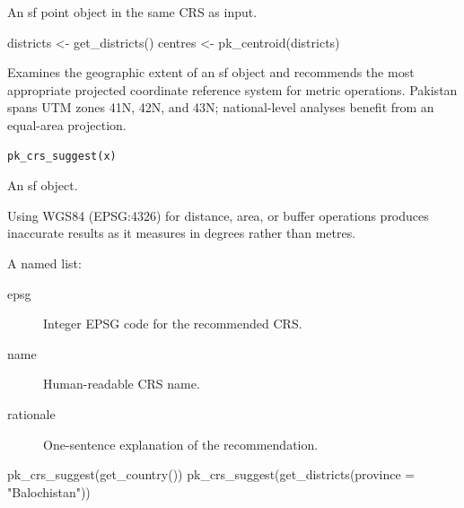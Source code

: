 \documentclass[a4paper]{book}
\begin{document}
%
\begin{Value}
An sf point object in the same CRS as input.
\end{Value}
%
\begin{Examples}
\begin{ExampleCode}

  districts <- get_districts()
  centres   <- pk_centroid(districts)

\end{ExampleCode}
\end{Examples}
%
\begin{Description}
Examines the geographic extent of an sf object and recommends the most
appropriate projected coordinate reference system for metric operations.
Pakistan spans UTM zones 41N, 42N, and 43N; national-level analyses
benefit from an equal-area projection.
\end{Description}
%
\begin{Usage}
\begin{verbatim}
pk_crs_suggest(x)
\end{verbatim}
\end{Usage}
%
\begin{Arguments}
\begin{ldescription}
\item[\code{x}] An sf object.
\end{ldescription}
\end{Arguments}
%
\begin{Details}
Using WGS84 (EPSG:4326) for distance, area, or buffer operations produces
inaccurate results as it measures in degrees rather than metres.
\end{Details}
%
\begin{Value}
A named list:
\begin{description}

\item[epsg] Integer EPSG code for the recommended CRS.
\item[name] Human-readable CRS name.
\item[rationale] One-sentence explanation of the recommendation.

\end{description}

\end{Value}
%
\begin{Examples}
\begin{ExampleCode}

  pk_crs_suggest(get_country())
  pk_crs_suggest(get_districts(province = "Balochistan"))

\end{ExampleCode}
\end{Examples}
\end{document}
